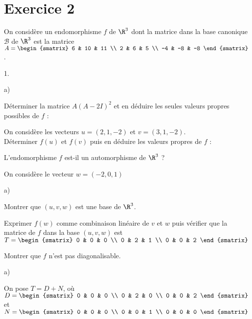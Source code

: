 \documentclass[11pt]{article}%
\begin{document}
\section*{Exercice 2}

On considère un endomorphisme $f$ de $\R^{3}$ dont la matrice
dans la base canonique $\mathcal{B}$ de $\R^{3}$ est la matrice $A = 
\begin{smatrix}
6 & 10 & 11 \\
2 & 6 & 5 \\
-4 & -8 & -8
\end{smatrix}
$.

\begin{noliste}{1.}
 \setlength{\itemsep}{4mm}
\item
\begin{noliste}{a)}
 \setlength{\itemsep}{2mm}
\item Déterminer la matrice $A\left( A-2I\right) ^{2}$ et en déduire
les seules valeurs propres possibles de $f$ :

\item On considère les vecteurs $u = \left( 2,1,-2\right) $ et $v =
\left(
3,1,-2\right) $.\\
Déterminer $f\left( u\right) $ et $f\left( v\right) $ puis en déduire
les valeurs propres de $f$ :

\item L'endomorphisme $f$ est-il un automorphisme de $\R^{3}$ ?
\end{noliste}

\item On considère le vecteur $w = \left( -2,0,1\right) $

\begin{noliste}{a)}
 \setlength{\itemsep}{2mm}
\item Montrer que $\left( u,v,w\right) $ est une base de $\R^{3}$.

\item Exprimer $f\left( w\right) $ comme combinaison linéaire de $v$ et
$w$ puis vérifier que la matrice de $f$ dans la base $\left(
u,v,w\right)
$ est $T = 
\begin{smatrix}
0 & 0 & 0 \\
0 & 2 & 1 \\
0 & 0 & 2
\end{smatrix}
$

\item Montrer que $f$ n'est pas diagonalisable.
\end{noliste}

\item
\begin{noliste}{a)}
 \setlength{\itemsep}{2mm}
\item On pose $T = D + N$, où $D = 
\begin{smatrix}
0 & 0 & 0 \\
0 & 2 & 0 \\
0 & 0 & 2
\end{smatrix}
$ et $N = 
\begin{smatrix}
0 & 0 & 0 \\
0 & 0 & 1 \\
0 & 0 & 0
\end{smatrix}
$


\end{noliste}
\end{noliste}
\end{document}
